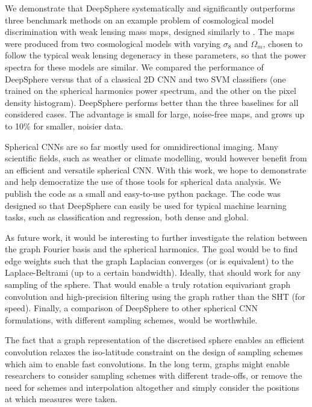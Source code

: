 \documentclass[final,twocolumn,3p,times,sort&compress]{elsarticle}
\newcommand{\1}{\b{1}}              %
\newcommand{\0}{\b{0}}              %
\begin{document}
We demonstrate that DeepSphere systematically and significantly outperforms three benchmark methods on an example problem of cosmological model discrimination with weak lensing mass maps, designed similarly to \citep{schmelze2017cosmologicalmodel}.
The maps were produced from two cosmological models with varying $\sigma_8$ and $\Omega_m$, chosen to follow the typical weak lensing degeneracy in these parameters, so that the power spectra for these models are similar.
We compared the performance of DeepSphere versus that of a classical 2D CNN and two SVM classifiers (one trained on the spherical harmonics power spectrum, and the other on the pixel density histogram).
DeepSphere performs better than the three baselines for all considered cases.
The advantage is small for large, noise-free maps, and grows up to 10\% for smaller, noisier data.

Spherical CNNs are so far mostly used for omnidirectional imaging.
Many scientific fields, such as weather or climate modelling, would however benefit from an efficient and versatile spherical CNN.
With this work, we hope to demonstrate and help democratize the use of those tools for spherical data analysis.
We publish the code as a small and easy-to-use python package.
The code was designed so that DeepSphere can easily be used for typical machine learning tasks, such as classification and regression, both dense and global.

As future work, it would be interesting to further investigate the relation between the graph Fourier basis and the spherical harmonics.
The goal would be to find edge weights such that the graph Laplacian converges (or is equivalent) to the Laplace-Beltrami (up to a certain bandwidth).
Ideally, that should work for any sampling of the sphere.
That would enable a truly rotation equivariant graph convolution and high-precision filtering using the graph rather than the SHT (for speed).
Finally, a comparison of DeepSphere to other spherical CNN formulations, with different sampling schemes, would be worthwhile.

The fact that a graph representation of the discretised sphere enables an efficient convolution relaxes the iso-latitude constraint on the design of sampling schemes which aim to enable fast convolutions.
In the long term, graphs might enable researchers to consider sampling schemes with different trade-offs, or remove the need for schemes and interpolation altogether and simply consider the positions at which measures were taken.
\end{document}
